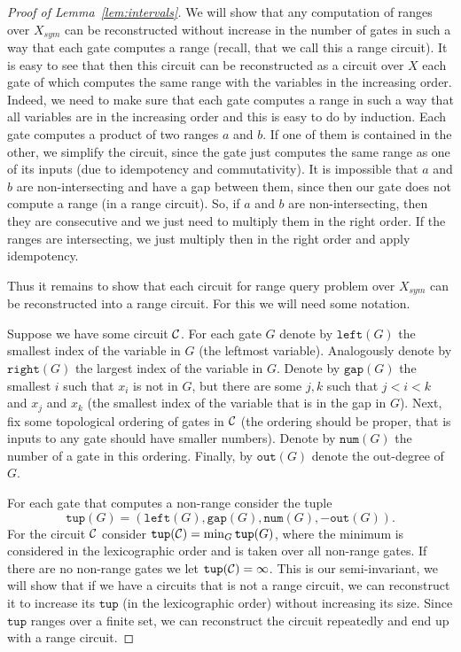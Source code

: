 \documentclass[11pt,letterpaper]{article}
\newcommand{\lef}{\texttt{left}}
\newcommand{\righ}{\texttt{right}}
\newcommand{\gap}{\texttt{gap}}
\newcommand{\num}{\texttt{num}}
\newcommand{\out}{\texttt{out}}
\newcommand{\tup}{\texttt{tup}}
\begin{document}
\begin{proof}[Proof of Lemma~\ref{lem:intervals}]
We will show that any computation of ranges over $X_{sym}$ can be reconstructed without increase in the number of gates in such a way that each gate computes a range (recall, that we call this a range circuit). It is easy to see that then this circuit can be reconstructed as a circuit over $X$ each gate of which computes the same range with the variables in the increasing order. Indeed, we need to make sure that each gate computes a range in such a way that all variables are in the increasing order and this is easy to do by induction. Each gate computes a product of two ranges $a$ and $b$. If one of them is contained in the other, we simplify the circuit, since the gate just computes the same range as one of its inputs (due to idempotency and commutativity). It is impossible that $a$ and $b$ are non-intersecting and have a gap between them, since then our gate does not compute a range (in a range circuit). So, if $a$ and  $b$ are non-intersecting, then they are consecutive and we just need to multiply them in the right order. If the ranges are intersecting, we just multiply then in the right order and apply idempotency.

Thus it remains to show that each circuit for range query problem over $X_{sym}$ can be reconstructed into a range circuit. For this we will need some notation.

Suppose we have some circuit ${\cal C}$. For each gate $G$ denote by $\lef(G)$ the smallest index of the variable in $G$ (the leftmost variable). Analogously denote by $\righ(G)$ the largest index of the variable in $G$. Denote by $\gap(G)$ the smallest $i$ such that $x_i$ is not in $G$, but there are some $j,k$ such that $j<i<k$ and $x_j$ and $x_k$ (the smallest index of the variable that is in the gap in $G$).
Next, fix some topological ordering of gates in ${\cal C}$ (the ordering should be proper, that is inputs to any gate should have smaller numbers). Denote by $\num(G)$ the number of a gate in this ordering. Finally, by $\out(G)$ denote the out-degree of $G$.

For each gate that computes a non-range consider the tuple
$$
\tup(G)=(\lef(G),\gap(G),\num(G),-\out(G)).
$$ For the circuit ${\cal C}$ consider $\tup({\cal C}) = \min_G \tup(G)$, where the minimum is considered in the lexicographic order and is taken over all non-range gates. If there are no non-range gates we let $\tup({\cal C})=\infty$. This is our semi-invariant, we will show that if we have a circuits that is not a range circuit, we can reconstruct it to increase  its $\tup$ (in the lexicographic order) without increasing its size. Since $\tup$ ranges over a finite set, we can reconstruct the circuit repeatedly and end up with a range circuit.


\end{proof}
\end{document}
